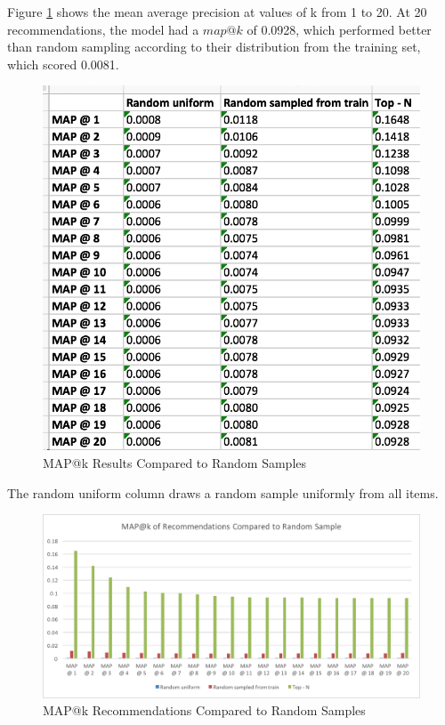 \documentclass[12pt,journal]{IEEEtran}
\begin{document}
Figure \ref{fig:mapkResults} shows the mean average precision at values of k from 1 to 20.  At 20 recommendations, the model had a $map@k$ of 0.0928, which performed better than random sampling according to their distribution from the training set, which scored 0.0081.

\begin{figure}[htbp]
\begin{center}
\includegraphics[width=1\columnwidth]{mapkResults}
\end{center}
\caption{MAP@k Results Compared to Random Samples}
\label{fig:mapkResults}
\end{figure}

The random uniform column draws a random sample uniformly from all items.

\begin{figure}[htbp]
\begin{center}
\includegraphics[width=1\columnwidth]{MAPkChart}
\end{center}
\caption{MAP@k Recommendations Compared to Random Samples}
\label{fig:mapkChart}
\end{figure}
\end{document}
